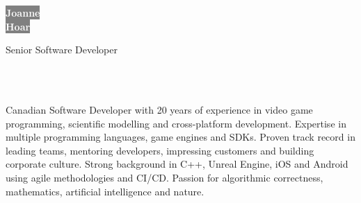 \documentclass[9pt]{developercv}
\begin{document}

\begin{minipage}[t]{0.45\textwidth}
\colorbox{gray}{\HUGE\textcolor{white}{\textbf{Joanne}}} \\
\colorbox{gray}{\HUGE\textcolor{white}{\textbf{Hoar}}}

{\huge Senior Software Developer}
\end{minipage}
\begin{minipage}[t]{0.275\textwidth}
\end{minipage}
\begin{minipage}[t]{0.275\textwidth}
\\
\\
\end{minipage}

\vspace{0.5cm}


Canadian Software Developer with 20 years of experience in video game programming, scientific modelling and cross-platform development. Expertise in multiple programming languages, game engines and SDKs. Proven track record in leading teams, mentoring developers, impressing customers and building corporate culture. Strong background in C++, Unreal Engine, iOS and Android using agile methodologies and CI/CD. Passion for algorithmic correctness, mathematics, artificial intelligence and nature.

\end{document}
